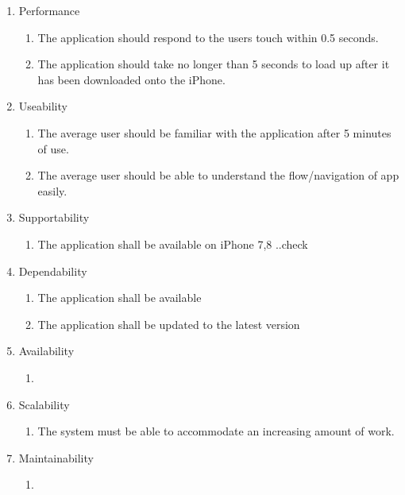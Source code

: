 \documentclass[11pt]{article}
\begin{document}
    \begin{enumerate}
        \item   Performance
            \begin{enumerate}[label*=\arabic*.]
            \item The application should respond to the users touch within 0.5 seconds.
             \item The application should take no longer than 5 seconds to load up after it has been downloaded onto the iPhone.
            \end{enumerate}
            
        \item Useability
            \begin{enumerate}[label*=\arabic*.]
            \item The average user should be familiar with the application after 5 minutes of use. 
            \item The average user should be able to understand the flow/navigation of app easily.
            \end{enumerate}
            
        \item Supportability
            \begin{enumerate}[label*=\arabic*.]
            \item The application shall be available on iPhone 7,8 ..check
            \end{enumerate}
            
        \item Dependability
            \begin{enumerate}[label*=\arabic*.]
            \item The application shall be available
            \item The application shall be updated to the latest version 
            \end{enumerate}
            
        \item Availability
            \begin{enumerate}[label*=\arabic*.]
            \item 
            \end{enumerate}
            
        \item Scalability
            \begin{enumerate}[label*=\arabic*.]
            \item The system must be able to accommodate an increasing amount of work. 
            \end{enumerate} 
            
        \item Maintainability
            \begin{enumerate}[label*=\arabic*.]
            \item %
            \end{enumerate}
         
    \end{enumerate}
\end{document}

